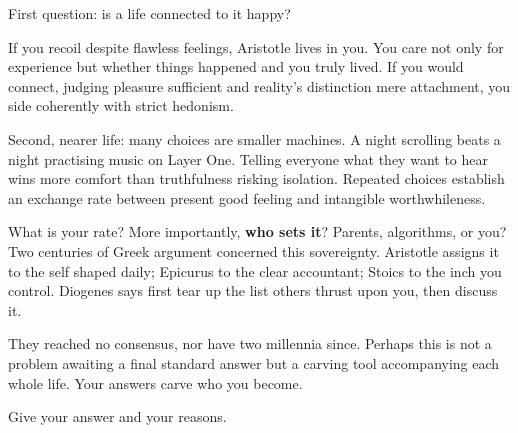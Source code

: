 First question: is a life connected to it happy?

If you recoil despite flawless feelings, Aristotle lives in you. You care not only for experience but whether things happened and you truly lived. If you would connect, judging pleasure sufficient and reality's distinction mere attachment, you side coherently with strict hedonism.

Second, nearer life: many choices are smaller machines. A night scrolling beats a night practising music on Layer One. Telling everyone what they want to hear wins more comfort than truthfulness risking isolation. Repeated choices establish an exchange rate between present good feeling and intangible worthwhileness.

What is your rate? More importantly, \textbf{who sets it}? Parents, algorithms, or you? Two centuries of Greek argument concerned this sovereignty. Aristotle assigns it to the self shaped daily; Epicurus to the clear accountant; Stoics to the inch you control. Diogenes says first tear up the list others thrust upon you, then discuss it.

They reached no consensus, nor have two millennia since. Perhaps this is not a problem awaiting a final standard answer but a carving tool accompanying each whole life. Your answers carve who you become.

Give your answer and your reasons.
